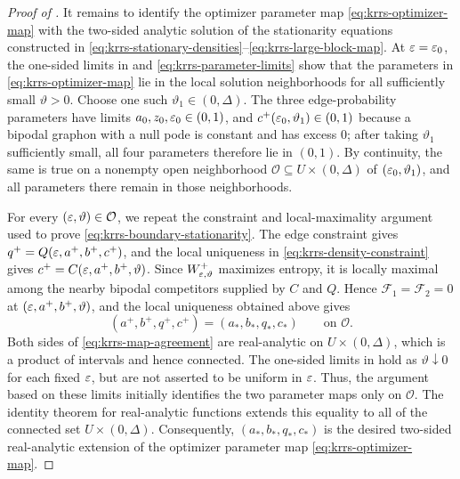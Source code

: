 \begin{proof}[Proof of ]
It remains to identify the optimizer parameter map
\eqref{eq:krrs-optimizer-map} with the two-sided analytic solution of the
stationarity equations constructed in
\eqref{eq:krrs-stationary-densities}--\eqref{eq:krrs-large-block-map}.  At \(\varepsilon=\varepsilon_0\), the
one-sided limits in  and
\eqref{eq:krrs-parameter-limits} show that the parameters in
\eqref{eq:krrs-optimizer-map} lie in the local solution neighborhoods
for all sufficiently small \(\vartheta>0\).  Choose one such
\(\vartheta_1\in(0,\Delta)\).  The three edge-probability parameters have
limits \(a_0,z_0,\varepsilon_0\in(0,1)\), and \(c^+(\varepsilon_0,\vartheta_1)\in(0,1)\)
because a bipodal graphon with a null pode is constant and has excess
\(0\); after taking \(\vartheta_1\) sufficiently small, all four parameters
therefore lie in \((0,1)\).  By continuity, the same is true on a nonempty
open neighborhood \(\mathcal O\subseteq U\times(0,\Delta)\) of
\((\varepsilon_0,\vartheta_1)\), and all parameters there remain in those
neighborhoods.

For every \((\varepsilon,\vartheta)\in\mathcal O\), we repeat the constraint and
local-maximality argument used to prove \eqref{eq:krrs-boundary-stationarity}.  The edge
constraint gives \(q^+=Q(\varepsilon,a^+,b^+,c^+)\), and the local uniqueness in
\eqref{eq:krrs-density-constraint} gives
\(c^+=C(\varepsilon,a^+,b^+,\vartheta)\).  Since
\(W^+_{\varepsilon,\vartheta}\) maximizes entropy, it is locally maximal among the
nearby bipodal competitors supplied by \(C\) and \(Q\).  Hence
\(\mathcal F_1=\mathcal F_2=0\) at
\((\varepsilon,a^+,b^+,\vartheta)\), and the local uniqueness obtained above gives
\begin{equation}\label{eq:krrs-map-agreement}
  (a^+,b^+,q^+,c^+)
  =(a_*,b_*,q_*,c_*)
  \qquad\text{on }\mathcal O.
\end{equation}
Both sides of \eqref{eq:krrs-map-agreement} are real-analytic on
\(U\times(0,\Delta)\), which is a product of intervals and hence connected.
The one-sided limits in  hold as
\(\vartheta\downarrow0\) for each fixed \(\varepsilon\), but are not asserted to be
uniform in \(\varepsilon\).  Thus, the argument based on these limits initially
identifies the two parameter maps only on \(\mathcal O\).  The identity
theorem for real-analytic functions extends this equality to all of the
connected set \(U\times(0,\Delta)\).  Consequently,
\((a_*,b_*,q_*,c_*)\) is the desired two-sided real-analytic extension of the
optimizer parameter map \eqref{eq:krrs-optimizer-map}.


\end{proof}
